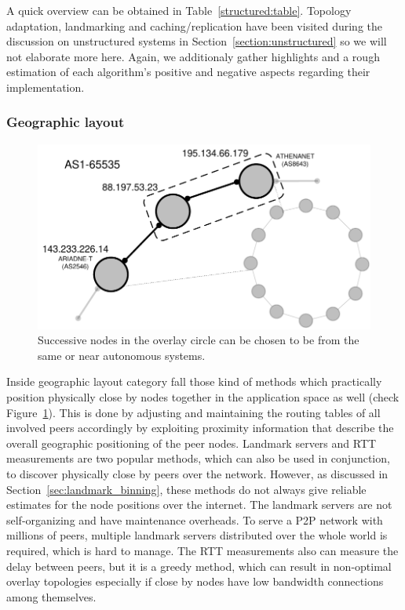 A quick overview can be obtained in Table~\ref{structured:table}. Topology
adaptation, landmarking and caching/replication have been visited during the
discussion on unstructured systems in Section~\ref{section:unstructured} so
we will not elaborate more here. Again, we additionaly gather highlights and a
rough estimation of each algorithm's positive and negative aspects regarding
their implementation.





\subsubsection{Geographic layout} \label{section:geographic_layout}

\begin{figure}[ht]
\centering
  \includegraphics[scale=0.4]{img/pdf/geographic-layout.pdf}
\caption{Successive nodes in the overlay circle can be chosen to be from the
same or near autonomous systems.}
\label{figure:geographic-layout}
\end{figure}

Inside geographic layout category fall those kind of methods which practically
position physically close by nodes together in the application space as well
(check Figure~\ref{figure:geographic-layout}). This is done by adjusting and
maintaining the routing tables of all involved peers accordingly by exploiting
proximity information that describe the overall geographic positioning of the
peer nodes. Landmark servers and RTT measurements are two popular methods, which
can also be used in conjunction, to discover physically close by peers over the
network. However, as discussed in Section~\ref{sec:landmark_binning}, these
methods do not always give reliable estimates for the node positions over the
internet. The landmark servers are not self-organizing and have maintenance
overheads. To serve a P2P network with millions of peers, multiple landmark
servers distributed over the whole world is required, which is hard to manage.
The RTT measurements also can measure the delay between peers, but it is a
greedy method, which can result in non-optimal overlay topologies especially if
close by nodes have low bandwidth connections among themselves.


